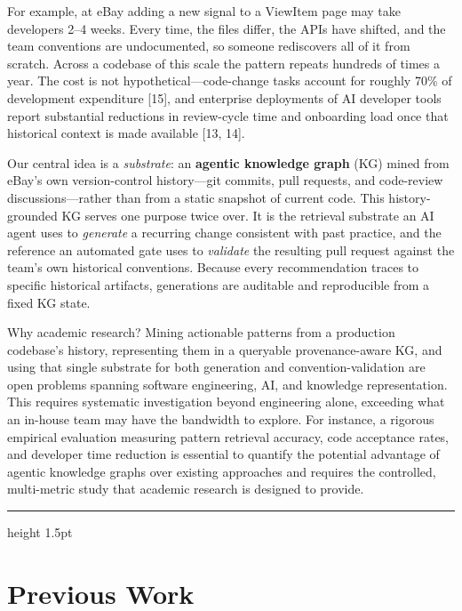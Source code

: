 \documentclass[11pt, letterpaper]{article}
\newcommand{\ehr}{{\color{gray!60}\hrule height 1.5pt}}
\begin{document}
For example, at eBay adding a new signal to a ViewItem page may take developers 2--4 weeks. Every time, the files differ, the APIs have shifted, and the team conventions are undocumented, so someone rediscovers all of it from scratch. Across a codebase of this scale the pattern repeats hundreds of times a year. The cost is not hypothetical---code-change tasks account for roughly 70\% of development expenditure [15], and enterprise deployments of AI developer tools report substantial reductions in review-cycle time and onboarding load once that historical context is made available [13, 14].


Our central idea is a \emph{substrate}: an \textbf{agentic knowledge graph} (KG) mined from eBay's own version-control history---git commits, pull requests, and code-review discussions---rather than from a static snapshot of current code. This history-grounded KG serves one purpose twice over. It is the retrieval substrate an AI agent uses to \emph{generate} a recurring change consistent with past practice, and the reference an automated gate uses to \emph{validate} the resulting pull request against the team's own historical conventions. Because every recommendation traces to specific historical artifacts, generations are auditable and reproducible from a fixed KG state.

Why academic research? Mining actionable patterns from a production codebase's history, representing them in a queryable provenance-aware KG, and using that single substrate for both generation and convention-validation are open problems spanning software engineering, AI, and knowledge representation. This requires systematic investigation beyond engineering alone, exceeding what an in-house team may have the bandwidth to explore. For instance, a rigorous empirical evaluation measuring pattern retrieval accuracy, code acceptance rates, and developer time reduction is essential to quantify the potential advantage of agentic knowledge graphs over existing approaches and requires the controlled, multi-metric study that academic research is designed to provide.

\ehr

\section*{Previous Work}
\label{sec:previous}

\end{document}
